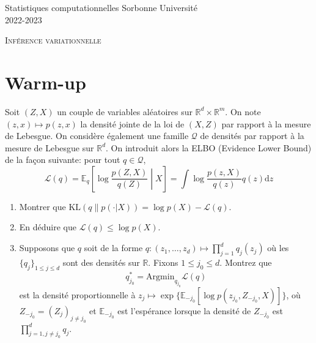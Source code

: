 \documentclass[a4paper,10pt,fleqn]{article}
\newcommand{\rset}{\ensuremath{\mathbb{R}}}
\newcommand{\1}{\ensuremath{\mathbbm{1}}}
\begin{document}
\noindent Statistiques computationnelles \hfill Sorbonne Universit\'e \\
 2022-2023

\noindent\hrulefill

\begin{center}
\textsc{Inf\'erence variationnelle}
\end{center}
\hrulefill

\medskip


\section{Warm-up}
Soit $(Z,X)$ un couple de variables al\'eatoires sur $\rset^d\times \rset^m$. On note $(z,x)\mapsto p(z,x)$ la densit\'e jointe de la loi de $(X,Z)$ par rapport \`a la mesure de Lebesgue. On consid\`ere \'egalement une famille $\mathcal{Q}$ de densit\'es par rapport \`a la mesure de Lebesgue sur $\rset^d$. On introduit alors la ELBO (Evidence Lower Bound) de la fa\c con suivante: pour tout $q\in\mathcal{Q}$,
$$
\mathcal{L}(q) = \mathbb{E}_q\left[\log\frac{p(Z,X)}{q(Z)}\middle | X\right] = \int \log\frac{p(z,X)}{q(z)}q(z) \mathrm{d} z
$$
\begin{enumerate}
\item Montrer que $\mathrm{KL}(q\|p(\cdot|X)) = \log p(X) - \mathcal{L}(q) $.
\item En d\'eduire que $\mathcal{L}(q) \leq \log p(X)$.
\item Supposons que $q$ soit de la forme $q:(z_1,\ldots,z_d)\mapsto \prod_{j=1}^dq_j(z_j)$ o\`u les $\{q_j\}_{1\leq j\leq d}$ sont des densit\'es sur $\rset$. Fixons $1\leq j_0 \leq d$. Montrez que 
$$
q_{j_0}^* = \mathrm{Argmin}_{q_{j_0}} \mathcal{L}(q) 
$$
est la densit\'e proportionnelle \`a $z_j \mapsto \exp\{\mathbb{E}_{-j_0}[\log p (z_{j_0},Z_{-j_0},X)]\}$, o\`u $Z_{-j_0} = (Z_j)_{j\neq j_0}$ et $\mathbb{E}_{-j_0}$ est l'esp\'erance lorsque la densit\'e de $Z_{-j_0}$ est $\prod_{j=1,j\neq j_0}^dq_j$.


\end{enumerate}
\end{document}
